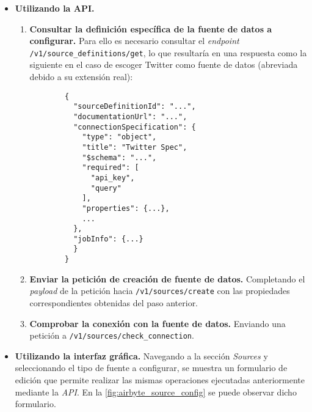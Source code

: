 \begin{itemize}
    
    \item \textbf{Utilizando la API.}
    
    \begin{enumerate}
        
        \item \textbf{Consultar la definición específica de la fuente de datos a configurar.} Para ello es necesario consultar el \textit{endpoint} \verb|/v1/source_definitions/get|, lo que resultaría en una respuesta como la siguiente en el caso de escoger Twitter como fuente de datos (abreviada debido a su extensión real):

        \begin{verbatim}
        {
          "sourceDefinitionId": "...",
          "documentationUrl": "...",
          "connectionSpecification": {
            "type": "object",
            "title": "Twitter Spec",
            "$schema": "...",
            "required": [
              "api_key",
              "query"
            ],
            "properties": {...},
            ...
          },
          "jobInfo": {...}
          }
        }
        \end{verbatim}
        
        \item \textbf{Enviar la petición de creación de fuente de datos.} Completando el \textit{payload} de la petición hacia \verb|/v1/sources/create| con las propiedades correspondientes obtenidas del paso anterior. 
        
        \item \textbf{Comprobar la conexión con la fuente de datos.} Enviando una petición a \verb|/v1/sources/check_connection|.
    
    \end{enumerate}
    
    \item \textbf{Utilizando la interfaz gráfica.} Navegando a la sección \textit{Sources} y seleccionando el tipo de fuente a configurar, se muestra un formulario de edición que permite realizar las mismas operaciones ejecutadas anteriormente mediante la \textit{API}. En la \autoref{fig:airbyte_source_config} se puede observar dicho formulario.

    
\end{itemize}

